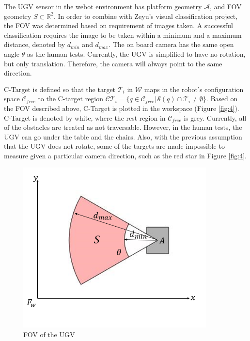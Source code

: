 \documentclass[12pt,draftcls,onecolumn]{IEEEtran}
\begin{document}
The UGV sensor in the webot environment has platform geometry $\mathcal{A}$, and FOV geometry $S \subset \mathbb{R}^2 $. 
In order to combine with Zeyu's visual classification project, the FOV was determined based on requirement of  images taken. 
A successful classification requires the image to be taken within a minimum and a maximum distance, denoted by $d_{min}$ and  $d_{max}$. 
The on board camera has the same open angle $\theta$ as the human tests. 
Currently, the UGV is simplified to have no rotation, but only translation.
Therefore, the camera will always point to the same direction. 
 

C-Target is defined so that the target $\mathcal{T}_i$ in $\mathcal{W}$ maps  in the robot's configuration space  $\mathcal{C}_{free}$ to the C-target region  $\mathcal{CT}_i = \{q \in \mathcal{C}_{free}    |    \mathcal{S}(q) \cap \mathcal{T}_i  \neq  \emptyset \}$.
Based on the FOV described above, C-Target is plotted in the workspace (Figure \ref{fig:4}).
C-Target is denoted by white, where the rest region in $\mathcal{C}_{free}$ is grey. 
Currently, all of the obstacles are treated as not traversable. 
However, in the human tests, the UGV can go under the table and the chairs. 
Also, with the previous assumption that the UGV does not rotate, some of the targets are made impossible to measure given a particular camera direction, such as the red star in Figure \ref{fig:4}. 



\begin{figure}
 \centering
  \includegraphics[width=10cm]{figures/FOV}
  \caption{FOV of the UGV}
  \label{fig:boat1}
\end{figure}
\end{document}
